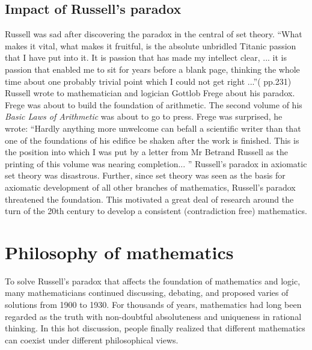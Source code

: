 \documentclass{article}
\begin{document}
\subsection{Impact of Russell's paradox}

Russell was sad after discovering the paradox in the central of set theory. ``What makes it vital, what makes it fruitful, is the absolute unbridled Titanic passion that I have put into it. It is passion that has made my intellect clear, ... it is passion that enabled me to sit for years before a blank page, thinking the whole time about one probably trivial point which I could not get right ...''(\cite{HanXueTao16} pp.231) Russell wrote to mathematician and logician Gottlob Frege about his paradox. Frege was about to build the foundation of arithmetic. The second volume of his {\em Basic Laws of Arithmetic} was about to go to press. Frege was surprised, he wrote: ``Hardly anything more unwelcome can befall a scientific writer than that one of the foundations of his edifice be shaken after the work is finished. This is the position into which I was put by a letter from Mr Betrand Russell as the printing of this volume was nearing completion... '' Russell's paradox in axiomatic set theory was disastrous. Further, since set theory was seen as the basis for axiomatic development of all other branches of mathematics, Russell's paradox threatened the foundation. This motivated a great deal of research around the turn of the 20th century to develop a consistent (contradiction free) mathematics.

\begin{Exercise}
\end{Exercise}

\section{Philosophy of mathematics}

To solve Russell's paradox that affects the foundation of mathematics and logic, many mathematicians continued discussing, debating, and proposed varies of solutions from 1900 to 1930. For thousands of years, mathematics had long been regarded as the truth with non-doubtful absoluteness and uniqueness in rational thinking. In this hot discussion, people finally realized that different mathematics can coexist under different philosophical views.
\end{document}

